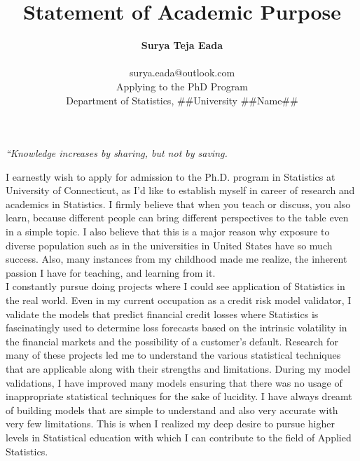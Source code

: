 \documentclass[10pt]{article}
\begin{document}
\title{Statement of Academic Purpose}
\date{}
\author{{\bf Surya Teja Eada} \\  \ \ \\ {\small surya.eada@outlook.com }\\ {\small Applying to the PhD Program } \\ {\small Department of Statistics, ##University ##Name## } }

\maketitle

\begin{flushright}

{\it “Knowledge increases by sharing, but not by saving.}

\end{flushright}


I earnestly wish to apply for admission to the Ph.D. program in Statistics at University of Connecticut, as I’d like to establish myself in career of research and academics in Statistics. I firmly believe that when you teach or discuss, you also learn, because different people can bring different perspectives to the table even in a simple topic. I also believe that this is a major reason why exposure to diverse population such as in the universities in United States have so much success. Also, many instances from my childhood made me realize, the inherent passion I have for teaching, and learning from it.  \\

I constantly pursue doing projects where I could see application of Statistics in the real world. Even in my current occupation as a credit risk model validator, I validate the models that predict financial credit losses where Statistics is fascinatingly used to determine loss forecasts based on the intrinsic volatility in the financial markets and the possibility of a customer’s default. Research for many of these projects led me to understand the various statistical techniques that are applicable along with their strengths and limitations. During my model validations, I have improved many models ensuring that there was no usage of inappropriate statistical techniques for the sake of lucidity. I have always dreamt of building models that are simple to understand and also very accurate with very few limitations. This is when I realized my deep desire to pursue higher levels in Statistical education with which I can contribute to the field of Applied Statistics.\\
\end{document}
